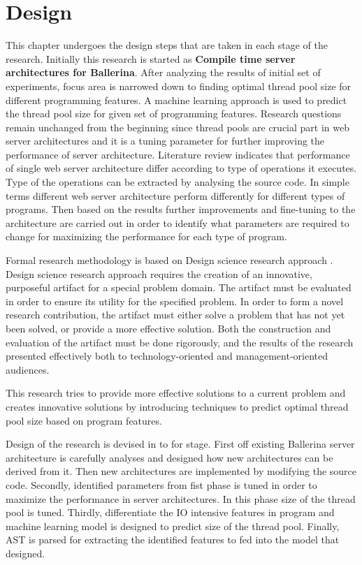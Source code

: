\chapter{Design}\label{chap:3}


This chapter undergoes the design steps that are taken in each stage of the research. Initially this research is started as\textbf{ Compile time server architectures for Ballerina}. After analyzing the results of initial set of experiments, focus area is narrowed down to finding optimal thread pool size for different programming features. A machine learning approach is used to predict the thread pool size for given set of programming features. Research questions remain unchanged from the beginning since thread pools are crucial part in web server architectures and it is a tuning parameter for further improving the performance of server architecture. Literature review indicates that performance of single web server architecture differ according to type of operations it executes. Type of the operations can be extracted by analysing the source code.  In simple terms different web server architecture perform differently for different types of programs. Then based on the results further improvements and fine-tuning to the architecture are carried out in order to identify what parameters are required to change for maximizing the performance for each type of program. 

Formal research methodology is based on Design science research approach \cite{design_science}. Design science research approach requires the creation of an innovative, purposeful artifact for a special problem domain. The artifact must be evaluated in order to ensure its utility for the specified problem. In order to form a novel research contribution, the artifact must either solve a problem that has not yet been solved, or provide a more effective solution. Both the construction and evaluation of the artifact must be done rigorously, and the results of the research presented effectively both to technology-oriented and management-oriented audiences.

This research tries to provide more effective solutions to a current problem and creates innovative solutions by introducing techniques to predict optimal thread pool size based on program features.

Design of the research is devised in to for stage. First off existing Ballerina server architecture is carefully analyses and designed how new architectures can be derived from it. Then new architectures are implemented by modifying the source code. Secondly, identified parameters from fist phase is tuned in order to maximize the performance in server architectures. In this phase size of the thread pool is tuned. Thirdly, differentiate the IO intensive features in program and machine learning model is designed to predict size of the thread pool. Finally, \acrshort{AST} is parsed for extracting the identified features to fed into the model that designed.


